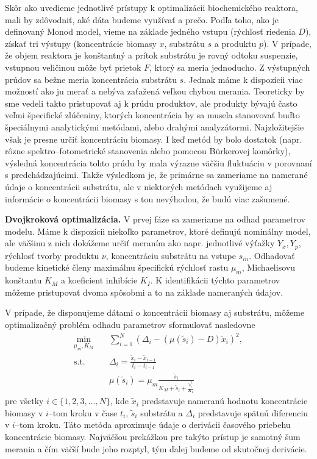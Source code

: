 Skôr ako uvedieme jednotlivé prístupy k optimalizácii biochemického reaktora, mali by zdôvodniť, aké dáta budeme využívať a prečo. Podľa toho, ako je definovaný Monod model, vieme na základe jedného vstupu (rýchlosť riedenia $ D $), získať tri výstupy (koncentrácie biomasy $ x $, substrátu $ s $ a produktu $ p $). V prípade, že objem reaktora je konštantný a prítok substrátu je rovný odtoku suspenzie, vstupnou veličinou môže byť prietok $ F $, ktorý sa meria jednoducho. Z výstupných prúdov sa bežne meria koncentrácia substrátu $ s $. Jednak máme k dispozícii viac možností ako ju merať a nebýva zaťažená veľkou chybou merania. Teoreticky by sme vedeli takto pristupovať aj k prúdu produktov, ale produkty bývajú často veľmi špecifické zlúčeniny, ktorých koncentrácia by sa musela stanovovať buďto špeciálnymi analytickými metódami, alebo drahými analyzátormi. Najzložitejšie však je presne určiť koncentráciu biomasy. I keď metód by bolo dostatok (napr. rôzne spektro--fotometrické stanovenia alebo pomocou B\"urkerovej komôrky), výsledná koncentrácia tohto prúdu by mala výrazne väčšiu fluktuáciu v porovnaní s predchádzajúcimi. Takže výsledkom je, že primárne sa zameriame na namerané údaje o koncentrácii substrátu, ale v niektorých metódach využijeme aj informácie o koncentrácii biomasy s tou nevýhodou, že budú viac zašumené.

\textbf{Dvojkroková optimalizácia.} 
V prvej fáze sa zameriame na odhad parametrov modelu. Máme k dispozícii niekoľko parametrov, ktoré definujú nominálny model, ale väčšinu z nich dokážeme určiť meraním ako napr. jednotlivé výťažky $ Y_{x}, Y_{p} $, rýchlosť tvorby produktu $ \nu $, koncentráciu substrátu na vstupe $ s_{in} $. Odhadovať budeme kinetické členy maximálnu špecifickú rýchlosť rastu $ \mu_{m} $, Michaelisovu konštantu $ K_{M} $ a koeficient inhibície $ K_{I} $. K identifikácii týchto parametrov môžeme pristupovať dvoma spôsobmi a to na základe nameraných údajov.

V prípade, že disponujeme dátami o koncentrácii biomasy aj substrátu, môžeme optimalizačný problém odhadu parametrov sformulovať nasledovne
\begin{equation}
	\begin{split}
		\min_{\mu_{m},K_{M}} \quad &\sum_{i=1}^{N} \left(\Delta_{i} - \left(\mu(\tilde{s}_{i}) - D\right)\tilde{x}_{i}\right)^2, \\
		\text{s.t.} \quad &\Delta_{i} = \frac{\tilde{x}_{i} - \tilde{x}_{i-1}}{t_{i} - t_{i-1}} \\
		\quad &\mu(\tilde{s}_{i})=\mu_{m}\frac{\tilde{s}_{i}}{K_{M} + \tilde{s}_{i} + \frac{\tilde{s}_{i}^2}{K_{I}}}
	\end{split}
\end{equation} 
pre všetky $ i \in \lbrace 1,2,3,\dots,N \rbrace $, kde $ \tilde{x}_{i} $ predstavuje nameranú hodnotu koncentrácie biomasy v $ i $--tom kroku v čase $ t_i $, $ \tilde{s}_{i} $ substrátu a 
$ \Delta_{i} $ predstavuje spätnú diferenciu v $ i $--tom kroku. Táto metóda aproximuje údaje o derivácii časového priebehu koncentrácie biomasy. Najväčšou prekážkou pre takýto prístup je samotný šum merania a čím väčší bude jeho rozptyl, tým ďalej budeme od skutočnej derivácie.

